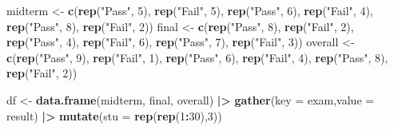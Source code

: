 \documentclass[
]{ctexart}
\newenvironment{Shaded}{\begin{snugshade}}{\end{snugshade}}
\newcommand{\AttributeTok}[1]{\textcolor[rgb]{0.13,0.29,0.53}{#1}}
\newcommand{\DecValTok}[1]{\textcolor[rgb]{0.00,0.00,0.81}{#1}}
\newcommand{\FunctionTok}[1]{\textcolor[rgb]{0.13,0.29,0.53}{\textbf{#1}}}
\newcommand{\NormalTok}[1]{#1}
\newcommand{\OtherTok}[1]{\textcolor[rgb]{0.56,0.35,0.01}{#1}}
\newcommand{\SpecialCharTok}[1]{\textcolor[rgb]{0.81,0.36,0.00}{\textbf{#1}}}
\newcommand{\StringTok}[1]{\textcolor[rgb]{0.31,0.60,0.02}{#1}}
\begin{document}
\begin{Shaded}
\begin{Highlighting}[]
\NormalTok{midterm }\OtherTok{\textless{}{-}} \FunctionTok{c}\NormalTok{(}\FunctionTok{rep}\NormalTok{(}\StringTok{"Pass"}\NormalTok{, }\DecValTok{5}\NormalTok{), }\FunctionTok{rep}\NormalTok{(}\StringTok{"Fail"}\NormalTok{, }\DecValTok{5}\NormalTok{), }\FunctionTok{rep}\NormalTok{(}\StringTok{"Pass"}\NormalTok{, }\DecValTok{6}\NormalTok{), }\FunctionTok{rep}\NormalTok{(}\StringTok{"Fail"}\NormalTok{, }\DecValTok{4}\NormalTok{), }\FunctionTok{rep}\NormalTok{(}\StringTok{"Pass"}\NormalTok{, }\DecValTok{8}\NormalTok{), }\FunctionTok{rep}\NormalTok{(}\StringTok{"Fail"}\NormalTok{, }\DecValTok{2}\NormalTok{))}
\NormalTok{final }\OtherTok{\textless{}{-}} \FunctionTok{c}\NormalTok{(}\FunctionTok{rep}\NormalTok{(}\StringTok{"Pass"}\NormalTok{, }\DecValTok{8}\NormalTok{), }\FunctionTok{rep}\NormalTok{(}\StringTok{"Fail"}\NormalTok{, }\DecValTok{2}\NormalTok{), }\FunctionTok{rep}\NormalTok{(}\StringTok{"Pass"}\NormalTok{, }\DecValTok{4}\NormalTok{), }\FunctionTok{rep}\NormalTok{(}\StringTok{"Fail"}\NormalTok{, }\DecValTok{6}\NormalTok{), }\FunctionTok{rep}\NormalTok{(}\StringTok{"Pass"}\NormalTok{, }\DecValTok{7}\NormalTok{), }\FunctionTok{rep}\NormalTok{(}\StringTok{"Fail"}\NormalTok{, }\DecValTok{3}\NormalTok{))}
\NormalTok{overall }\OtherTok{\textless{}{-}} \FunctionTok{c}\NormalTok{(}\FunctionTok{rep}\NormalTok{(}\StringTok{"Pass"}\NormalTok{, }\DecValTok{9}\NormalTok{), }\FunctionTok{rep}\NormalTok{(}\StringTok{"Fail"}\NormalTok{, }\DecValTok{1}\NormalTok{), }\FunctionTok{rep}\NormalTok{(}\StringTok{"Pass"}\NormalTok{, }\DecValTok{6}\NormalTok{), }\FunctionTok{rep}\NormalTok{(}\StringTok{"Fail"}\NormalTok{, }\DecValTok{4}\NormalTok{), }\FunctionTok{rep}\NormalTok{(}\StringTok{"Pass"}\NormalTok{, }\DecValTok{8}\NormalTok{), }\FunctionTok{rep}\NormalTok{(}\StringTok{"Fail"}\NormalTok{, }\DecValTok{2}\NormalTok{))}

\NormalTok{df }\OtherTok{\textless{}{-}} \FunctionTok{data.frame}\NormalTok{(midterm, final, overall) }\SpecialCharTok{|\textgreater{}} 
  \FunctionTok{gather}\NormalTok{(}\AttributeTok{key =} \StringTok{\textquotesingle{}exam\textquotesingle{}}\NormalTok{,}\AttributeTok{value =} \StringTok{\textquotesingle{}result\textquotesingle{}}\NormalTok{) }\SpecialCharTok{|\textgreater{}}
  \FunctionTok{mutate}\NormalTok{(}\AttributeTok{stu =} \FunctionTok{rep}\NormalTok{(}\FunctionTok{rep}\NormalTok{(}\DecValTok{1}\SpecialCharTok{:}\DecValTok{30}\NormalTok{),}\DecValTok{3}\NormalTok{))}
\end{Highlighting}
\end{Shaded}
\end{document}
